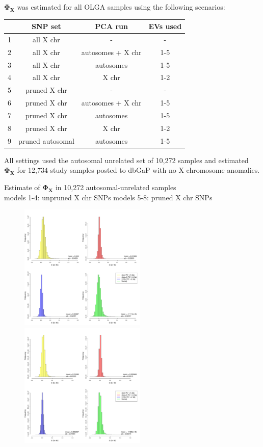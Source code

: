 \documentclass{beamer}
\begin{document}
\begin{frame}
$\mathbf{\Phi_X}$ was estimated for all OLGA samples using the following scenarios:
\begin{table}[ht]
\centering
\begin{tabular}{r|ccc}
  \hline
   &SNP set& PCA run & EVs used \\ 
  \hline
1 &all X chr & - & - \\
2 & all X chr & autosomes + X chr & 1-5 \\
3 & all X chr & autosomes & 1-5\\
4 & all X chr & X chr & 1-2\\ \hline
5 & pruned X chr & - & - \\
6 & pruned X chr & autosomes + X chr & 1-5\\
7 & pruned X chr & autosomes & 1-5\\
8 & pruned X chr & X chr & 1-2 \\
   \hline
9 & pruned autosomal & autosomes & 1-5\\
\end{tabular}
\end{table}
All settings used the autosomal unrelated set of 10,272 samples and estimated $\mathbf{\Phi_X}$ for 12,734 study samples posted to dbGaP with no X chromosome anomalies.
\end{frame}

\begin{frame}
\footnotesize Estimate of $\mathbf{\Phi_X}$ in 10,272 autosomal-unrelated samples \\
models 1-4: unpruned X chr SNPs \hspace{1.5cm} models 5-8: pruned X chr SNPs
\centering
\begin{figure}
\includegraphics[height=6cm]{../hist_allXchrKC.pdf} \vline
\includegraphics[height=6cm]{../hist_allXPrunedKC.pdf}
\end{figure}
\end{frame}
\end{document}
